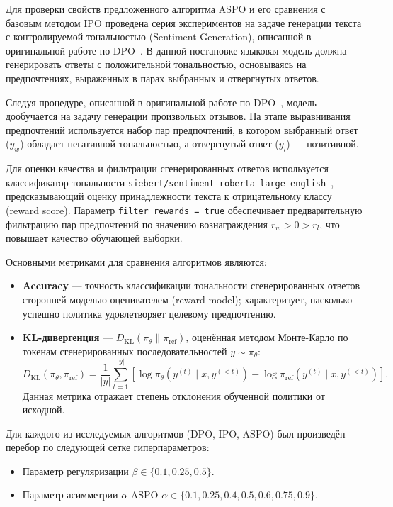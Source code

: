 \documentclass[a4paper,12pt]{article}
\begin{document}
Для проверки свойств предложенного алгоритма ASPO и его сравнения с базовым методом IPO проведена серия экспериментов на задаче генерации текста с контролируемой тональностью (Sentiment Generation), описанной в оригинальной работе по DPO~\cite{rafailov2023direct}. В данной постановке языковая модель должна генерировать ответы с положительной тональностью, основываясь на предпочтениях, выраженных в парах выбранных и отвергнутых ответов.

Следуя процедуре, описанной в оригинальной работе по DPO~\cite{rafailov2023direct}, модель дообучается на задачу генерации произвольых отзывов. На этапе выравнивания предпочтений используется набор пар предпочтений, в котором выбранный ответ ($y_w$) обладает негативной тональностью, а отвергнутый ответ ($y_l$) — позитивной.

Для оценки качества и фильтрации сгенерированных ответов используется классификатор тональности \texttt{siebert/sentiment-roberta-large-english}~\cite{hartmann2023}, предсказывающий оценку принадлежности текста к отрицательному классу (reward score). Параметр \texttt{filter\_rewards = true} обеспечивает предварительную фильтрацию пар предпочтений по значению вознаграждения $r_w>0>r_l$, что повышает качество обучающей выборки.

Основными метриками для сравнения алгоритмов являются:

\begin{itemize}
    \item \textbf{Accuracy} — точность классификации тональности сгенерированных ответов сторонней моделью-оценивателем (reward model); характеризует, насколько успешно политика удовлетворяет целевому предпочтению.
    \item \textbf{KL-дивергенция} — $D_{\mathrm{KL}}(\pi_\theta \| \pi_{\text{ref}})$, оценённая методом Монте-Карло по токенам сгенерированных последовательностей $y \sim \pi_\theta$:
    \[
    D_{\mathrm{KL}}(\pi_\theta, \pi_{\text{ref}}) = \frac{1}{|y|} \sum_{t=1}^{|y|} \left[ \log \pi_\theta(y^{(t)} \mid x, y^{(<t)}) - \log \pi_{\text{ref}}(y^{(t)} \mid x, y^{(<t)}) \right].
    \]
    Данная метрика отражает степень отклонения обученной политики от исходной.
\end{itemize}


Для каждого из исследуемых алгоритмов (DPO, IPO, ASPO) был произведён перебор по следующей сетке гиперпараметров:
\begin{itemize}
    \item Параметр регуляризации $\beta \in \{0.1, 0.25, 0.5\}$.
    \item Параметр асимметрии $\alpha$ ASPO $\alpha \in \{0.1, 0.25, 0.4, 0.5, 0.6, 0.75, 0.9\}$.
\end{itemize}
\end{document}
